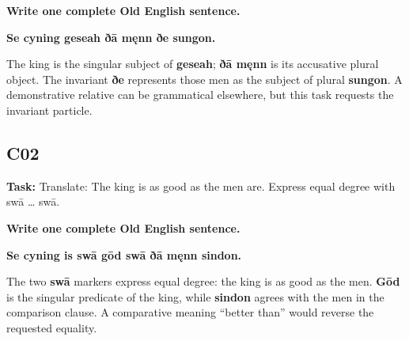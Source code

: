 \textbf{Write one complete Old English sentence.}

\textbf{Se cyning geseah ðā męnn ðe sungon.}

The king is the singular subject of \textbf{geseah}; \textbf{ðā męnn} is its accusative plural object. The invariant \textbf{ðe} represents those men as the subject of plural \textbf{sungon}. A demonstrative relative can be grammatical elsewhere, but this task requests the invariant particle.

\subsection*{C02}

\textbf{Task:} Translate: The king is as good as the men are. Express equal degree with swā … swā.

\textbf{Write one complete Old English sentence.}

\textbf{Se cyning is swā gōd swā ðā męnn sindon.}

The two \textbf{swā} markers express equal degree: the king is as good as the men. \textbf{Gōd} is the singular predicate of the king, while \textbf{sindon} agrees with the men in the comparison clause. A comparative meaning “better than” would reverse the requested equality.


